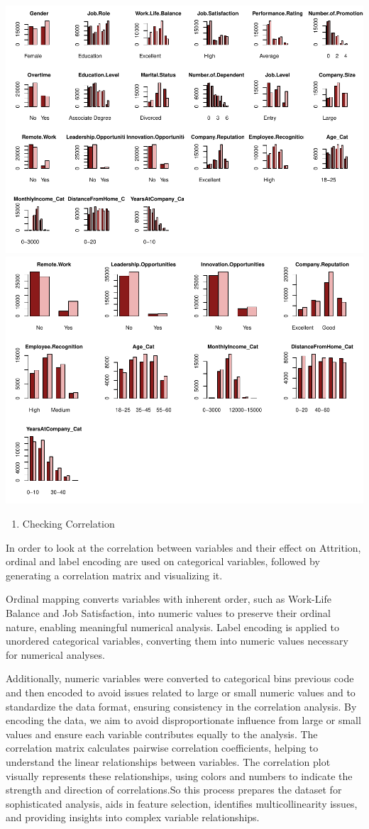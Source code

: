 \documentclass[
  10pt,
  paper=a4,
  ,captions=tableheading
]{scrartcl}
\providecommand{\tightlist}{%
  \setlength{\itemsep}{0pt}\setlength{\parskip}{0pt}}
\begin{document}
\includegraphics[width=0.75\linewidth]{figs/data_transform-1}
\includegraphics[width=0.75\linewidth]{figs/data_transform-2}

\small

\begin{enumerate}
\def\labelenumi{\arabic{enumi}.}
\setcounter{enumi}{8}
\tightlist
\item
  Checking Correlation
\end{enumerate}

In order to look at the correlation between variables and their effect
on Attrition, ordinal and label encoding are used on categorical
variables, followed by generating a correlation matrix and visualizing
it.

Ordinal mapping converts variables with inherent order, such as
Work-Life Balance and Job Satisfaction, into numeric values to preserve
their ordinal nature, enabling meaningful numerical analysis. Label
encoding is applied to unordered categorical variables, converting them
into numeric values necessary for numerical analyses.

Additionally, numeric variables were converted to categorical bins
previous code and then encoded to avoid issues related to large or small
numeric values and to standardize the data format, ensuring consistency
in the correlation analysis. By encoding the data, we aim to avoid
disproportionate influence from large or small values and ensure each
variable contributes equally to the analysis. The correlation matrix
calculates pairwise correlation coefficients, helping to understand the
linear relationships between variables. The correlation plot visually
represents these relationships, using colors and numbers to indicate the
strength and direction of correlations.So this process prepares the
dataset for sophisticated analysis, aids in feature selection,
identifies multicollinearity issues, and providing insights into complex
variable relationships.
\end{document}
